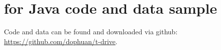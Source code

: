 \documentclass[journal]{IEEEtran}
\begin{document}

%

\appendices
\section{for Java code and data sample}
Code and data can be found and downloaded via github: \url{https://github.com/dophuan/t-drive}.
\end{document}
